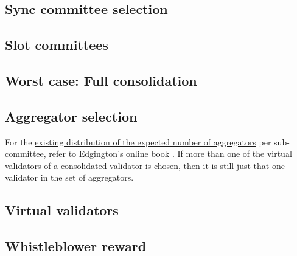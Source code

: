 \documentclass[UTF8]{article}
\begin{document}
\subsection{Sync committee selection}

\subsection{Slot committees}

\subsection{Worst case: Full consolidation}

\subsection{Aggregator selection}
For the \href{https://eth2book.info/capella/part2/building_blocks/aggregator/}{existing distribution of the expected number of aggregators} per sub-committee, refer to Edgington's online book \cite{Edgington2023}.
If more than one of the virtual validators of a consolidated validator is chosen, then it is still just that one validator in the set of aggregators. 

\subsection{Virtual validators}



\subsection{Whistleblower reward}





\end{document}

